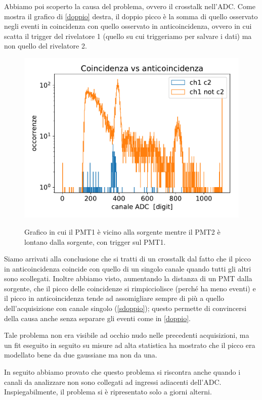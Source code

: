 Abbiamo poi scoperto la causa del problema, ovvero il crosstalk nell'ADC.
Come mostra il grafico di \autoref{doppio} destra, il doppio picco è la somma di quello osservato negli eventi in coincidenza con quello osservato in anticoincidenza,
ovvero in cui scatta il trigger del rivelatore 1 (quello su cui triggeriamo per salvare i dati) ma non quello del rivelatore 2.



\begin{figure}
\centering
\subfloat
{
\includegraphics[width=20 em]{immagini/dist}
}
\caption{Grafico in cui il PMT1 è vicino alla sorgente mentre il PMT2 è lontano dalla sorgente,
con trigger sul PMT1.}
\label{sdoppio}
\end{figure}

Siamo arrivati alla conclusione che si tratti di un crosstalk dal fatto che il picco in anticoincidenza coincide con quello di un singolo canale quando tutti gli altri sono scollegati.
Inoltre abbiamo visto, aumentando la distanza di un PMT dalla sorgente, che il picco delle coincidenze si rimpicciolisce (perché ha meno eventi) e il picco in anticoincidenza tende ad assomigliare sempre di più a quello dell'acquisizione con canale singolo (\autoref{sdoppio});
questo permette di convincersi della causa anche senza separare gli eventi come in \autoref{doppio}.

Tale problema non era visibile ad occhio nudo nelle precedenti acquisizioni, ma un fit eseguito in seguito su misure ad alta statistica ha mostrato che il picco era modellato bene da due gaussiane ma non da una.

In seguito abbiamo provato che questo problema si riscontra anche quando i canali da analizzare non sono collegati ad ingressi adiacenti dell'ADC. Inspiegabilmente, il problema si è ripresentato solo a giorni alterni. 
